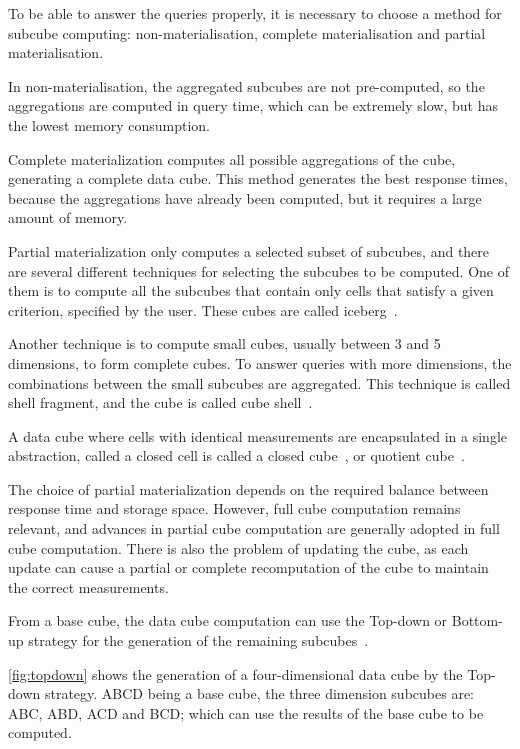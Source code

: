 To be able to answer the queries properly, it is necessary to choose a method for subcube computing: non-materialisation, complete materialisation and partial materialisation.

In non-materialisation, the aggregated subcubes are not pre-computed, so the aggregations are computed in query time, which can be extremely slow, but has the lowest memory consumption.

Complete materialization computes all possible aggregations of the cube, generating a complete data cube.
This method generates the best response times, because the aggregations have already been computed, but it requires a large amount of memory.

Partial materialization only computes a selected subset of subcubes, and there are several different techniques for selecting the subcubes to be computed.
One of them is to compute all the subcubes that contain only cells that satisfy a given criterion, specified by the user.
These cubes are called iceberg~\cite{beyerBottomupComputationSparse1999}.

Another technique is to compute small cubes, usually between 3 and 5 dimensions, to form complete cubes.
To answer queries with more dimensions, the combinations between the small subcubes are aggregated.
This technique is called shell fragment, and the cube is called cube shell~\cite{liHighdimensionalOLAPMinimal2004}.

A data cube where cells with identical measurements are encapsulated in a single abstraction, called a closed cell is called a closed cube~\cite{dongCCubingEfficientComputation2006}, or quotient cube~\cite{lakshmananQuotientCubeHow2002}.

The choice of partial materialization depends on the required balance between response time and storage space.
However, full cube computation remains relevant, and advances in partial cube computation are generally adopted in full cube computation.
There is also the problem of updating the cube, as each update can cause a partial or complete recomputation of the cube to maintain the correct measurements.

From a base cube, the data cube computation can use the Top-down or Bottom-up strategy for the generation of the remaining subcubes~\cite{hanDataMiningConcepts2011}.

\autoref{fig:topdown} shows the generation of a four-dimensional data cube by the Top-down strategy.
ABCD being a base cube, the three dimension subcubes are: ABC, ABD, ACD and BCD; which can use the results of the base cube to be computed.

